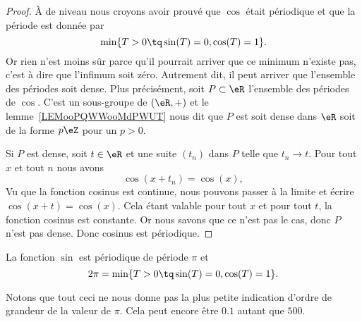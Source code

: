 \begin{proof}
    À de niveau nous croyons avoir prouvé que \( \cos\) était périodique et que la période est donnée par
    \begin{equation}
        \min\{ T>0\tq \sin(T)=0,\cos(T)=1 \}.
    \end{equation}
    Or rien n'est moins sûr parce qu'il pourrait arriver que ce minimum n'existe pas, c'est à dire que l'infimum soit zéro. Autrement dit, il peut arriver que l'ensemble des périodes soit dense. Plus précisément, soit \( P\subset \eR\) l'ensemble des périodes de \( \cos\). C'est un sous-groupe de \( (\eR,+)\) et le lemme~\ref{LEMooPQWWooMdPWUT} nous dit que \( P\) est soit dense dans \( \eR\) soit de la forme \( p\eZ\) pour un \( p>0\).

    Si \( P\) est dense, soit \( t\in \eR\) et une suite \( (t_n)\) dans \( P\) telle que \( t_n\to t\). Pour tout \( x\) et tout \( n\) nous avons
    \begin{equation}
        \cos(x+t_n)=\cos(x),
    \end{equation}
    Vu que la fonction cosinus est continue, nous pouvons passer à la limite et écrire \( \cos(x+t)=\cos(x)\). Cela étant valable pour tout \( x\) et pour tout \( t\), la fonction cosinus est constante. Or nous savons que ce n'est pas le cas, donc \( P\) n'est pas dense. Donc cosinus est périodique.
\end{proof}

\begin{proposition}     \label{PROPooKNLAooLwQHea}
    La fonction \( \sin\) est périodique de période \( \pi\) et
    \begin{equation}
        2\pi=\min\{ T>0\tq \sin(T)=0,\cos(T)=1 \}.
    \end{equation}
\end{proposition}

\begin{normaltext}
Notons que tout ceci ne nous donne pas la plus petite indication d'ordre de grandeur de la valeur de \( \pi\). Cela peut encore être \( 0.1\) autant que \( 500\).
\end{normaltext}

